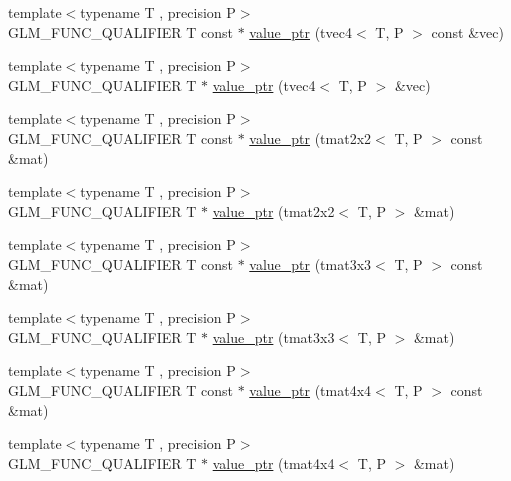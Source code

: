 \begin{DoxyCompactItemize}
{\footnotesize template$<$typename T , precision P$>$ }\\G\+L\+M\+\_\+\+F\+U\+N\+C\+\_\+\+Q\+U\+A\+L\+I\+F\+I\+E\+R T const $\ast$ \hyperlink{group__gtc__type__ptr_gaf641bc0e28d4b274826b9afed315d310}{value\+\_\+ptr} (tvec4$<$ T, P $>$ const \&vec)
\item 
{\footnotesize template$<$typename T , precision P$>$ }\\G\+L\+M\+\_\+\+F\+U\+N\+C\+\_\+\+Q\+U\+A\+L\+I\+F\+I\+E\+R T $\ast$ \hyperlink{group__gtc__type__ptr_ga4c19763f3c5991b9dc88a3ffdd9ea6cd}{value\+\_\+ptr} (tvec4$<$ T, P $>$ \&vec)
\item 
{\footnotesize template$<$typename T , precision P$>$ }\\G\+L\+M\+\_\+\+F\+U\+N\+C\+\_\+\+Q\+U\+A\+L\+I\+F\+I\+E\+R T const $\ast$ \hyperlink{group__gtc__type__ptr_ga2d709523aa0beb0a42433f80c9d07718}{value\+\_\+ptr} (tmat2x2$<$ T, P $>$ const \&mat)
\item 
{\footnotesize template$<$typename T , precision P$>$ }\\G\+L\+M\+\_\+\+F\+U\+N\+C\+\_\+\+Q\+U\+A\+L\+I\+F\+I\+E\+R T $\ast$ \hyperlink{group__gtc__type__ptr_gac7256e14328e818e61276fa5e6176b9d}{value\+\_\+ptr} (tmat2x2$<$ T, P $>$ \&mat)
\item 
{\footnotesize template$<$typename T , precision P$>$ }\\G\+L\+M\+\_\+\+F\+U\+N\+C\+\_\+\+Q\+U\+A\+L\+I\+F\+I\+E\+R T const $\ast$ \hyperlink{group__gtc__type__ptr_ga0fd20ac385befba86cf2bbf836728bc2}{value\+\_\+ptr} (tmat3x3$<$ T, P $>$ const \&mat)
\item 
{\footnotesize template$<$typename T , precision P$>$ }\\G\+L\+M\+\_\+\+F\+U\+N\+C\+\_\+\+Q\+U\+A\+L\+I\+F\+I\+E\+R T $\ast$ \hyperlink{group__gtc__type__ptr_ga4470e16d0e844cb2c4f7b2e731824f87}{value\+\_\+ptr} (tmat3x3$<$ T, P $>$ \&mat)
\item 
{\footnotesize template$<$typename T , precision P$>$ }\\G\+L\+M\+\_\+\+F\+U\+N\+C\+\_\+\+Q\+U\+A\+L\+I\+F\+I\+E\+R T const $\ast$ \hyperlink{group__gtc__type__ptr_ga2edadf5433694bf018d62db962b61321}{value\+\_\+ptr} (tmat4x4$<$ T, P $>$ const \&mat)
\item 
{\footnotesize template$<$typename T , precision P$>$ }\\G\+L\+M\+\_\+\+F\+U\+N\+C\+\_\+\+Q\+U\+A\+L\+I\+F\+I\+E\+R T $\ast$ \hyperlink{group__gtc__type__ptr_ga1fc49ab60e5afdd4821a6903e92244a4}{value\+\_\+ptr} (tmat4x4$<$ T, P $>$ \&mat)
\item 

\end{DoxyCompactItemize}
